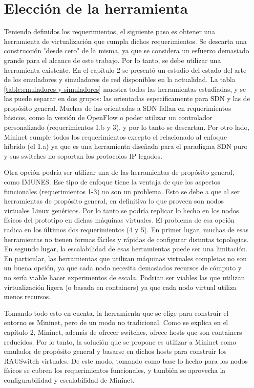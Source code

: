 \section{Elección de la herramienta}
Teniendo definidos los requerimientos, el siguiente paso es obtener una herramienta de virtualización que cumpla dichos requerimientos. Se descarta una construcción "desde cero" de la misma, ya que se considera un esfuerzo demasiado grande para el alcance de este trabajo. Por lo tanto, se debe utilizar una herramienta existente. En el capítulo 2 se presentó un estudio del estado del arte de los emuladores y simuladores de red disponibles en la actualidad. La tabla \ref{table:emuladores-y-simuladores} muestra todas las herramientas estudiadas, y se las puede separar en dos grupos: las orientadas específicamente para SDN y las de propósito general. Muchas de las orientadas a SDN fallan en requerimientos básicos, como la versión de OpenFlow o poder utilizar un controlador personalizado (requerimientos 1.b y 3), y por lo tanto se descartan. Por otro lado, Mininet cumple todos los requerimientos excepto el relacionado al enfoque híbrido (el 1.a) ya que es una herramienta diseñada para el paradigma SDN puro y sus switches no soportan los protocolos IP legados.

Otra opción podría ser utilizar una de las herramientas de propósito general, como IMUNES. Ese tipo de enfoque tiene la ventaja de que los aspectos funcionales (requerimientos 1-3) no son un problema. Esto se debe a que al ser herramientas de propósito general, en definitiva lo que proveen son nodos virtuales Linux genéricos. Por lo tanto se podría replicar lo hecho en los nodos físicos del prototipo en dichas máquinas virtuales. 
El problema de esa opción radica en los últimos dos requerimientos (4 y 5). En primer lugar, muchas de esas herramientas no tienen formas fáciles y rápidas de configurar distintas topologias. En segundo lugar, la escalabilidad de esas herramientas puede ser una limitación. En particular, las herramientas que utilizan máquinas virtuales completas no son un buena opción, ya que cada nodo necesita demasiados recursos de cómputo y no sería viable hacer experimentos de escala. Podrían ser viables las que utilizan virtualización ligera (o basada en containers) ya que cada nodo virtual utiliza menos recursos.

Tomando todo esto en cuenta, la herramienta que se elige para construir el entorno es Mininet, pero de un modo no tradicional. Como se explica en el capítulo 2, Mininet, además de ofrecer switches, ofrece hosts que son containers reducidos. Por lo tanto, la solución que se propone es utilizar a Mininet como emulador de propósito general y basarse en dichos hosts para construir los RAUSwitch virtuales. De este modo, tomando como base lo hecho para los nodos físicos se cubren los requerimientos funcionales, y también se aprovecha la configurabilidad y escalabilidad de Mininet.

